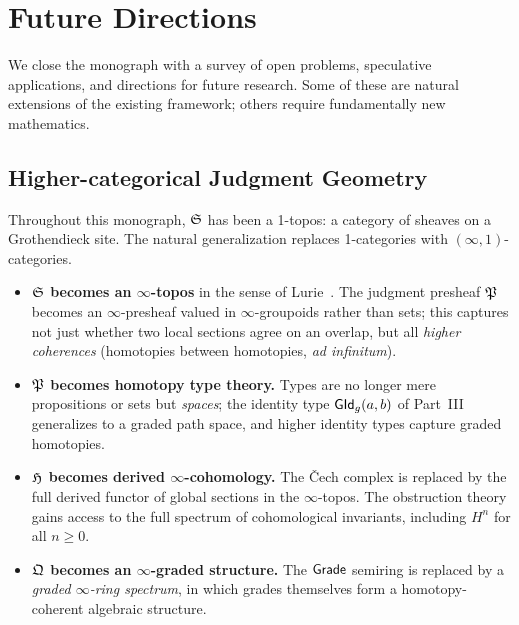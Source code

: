 \chapter{Future Directions}
\label{ch:future}

We close the monograph with a survey of open problems, speculative
applications, and directions for future research.  Some of these are
natural extensions of the existing framework; others require
fundamentally new mathematics.

\section{Higher-categorical Judgment Geometry}
\label{sec:higher-cat}

Throughout this monograph, $\mathfrak{S}$ has been a 1-topos: a category
of sheaves on a Grothendieck site.  The natural generalization
replaces 1-categories with $(\infty,1)$-categories.

\begin{itemize}
  \item \textbf{$\mathfrak{S}$ becomes an $\infty$-topos} in the sense of
        Lurie~\cite{lurie2009}.  The judgment presheaf $\mathfrak{P}$
        becomes an $\infty$-presheaf valued in $\infty$-groupoids
        rather than sets; this captures not just whether two
        local sections agree on an overlap, but all \emph{higher
        coherences} (homotopies between homotopies, \emph{ad
        infinitum}).
  \item \textbf{$\mathfrak{P}$ becomes homotopy type theory.}\;
        Types are no longer mere propositions or sets but
        \emph{spaces}; the identity type $\mathsf{GId}_g(a,b)$ of Part~III
        generalizes to a graded path space, and higher identity
        types capture graded homotopies.
  \item \textbf{$\mathfrak{H}$ becomes derived $\infty$-cohomology.}\;
        The \v{C}ech complex is replaced by the full derived
        functor of global sections in the $\infty$-topos.  The
        obstruction theory gains access to the full spectrum of
        cohomological invariants, including $H^n$ for all $n \geq 0$.
  \item \textbf{$\mathfrak{Q}$ becomes an $\infty$-graded structure.}\;
        The $\mathsf{Grade}$ semiring is replaced by a
        \emph{graded $\infty$-ring spectrum}, in which grades
        themselves form a homotopy-coherent algebraic structure.
\end{itemize}

